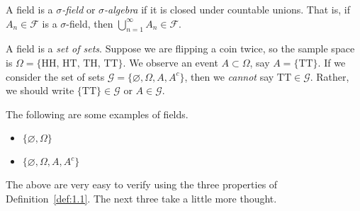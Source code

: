 \documentclass[11pt,fleqn]{book} %
\begin{document}
\begin{definition} \label{def:1.2}
	A field is a \emph{$\sigma$-field} or \emph{$\sigma$-algebra} if it is closed under countable unions. That is, if $A_n \in \mathcal{F}$ is a $\sigma$-field, then $\bigcup_{n=1}^\infty A_n \in \mathcal{F}$.
\end{definition}

\begin{remark} \label{rem:1.1}
	A field is a \emph{set of sets}. Suppose we are flipping a coin twice, so the sample space is $\Omega = \{\textrm{HH, HT, TH, TT}\}$. We observe an event $A \subset \Omega$, say $A = \{\textrm{TT}\}$. If we consider the set of sets $\mathcal{G} = \{\varnothing, \Omega, A, A^c\}$, then we \emph{cannot} say $\textrm{TT} \in \mathcal{G}$. Rather, we should write $\{\textrm{TT}\} \in \mathcal{G}$ or $A \in \mathcal{G}$. 
\end{remark}

The following are some examples of fields.

\begin{itemize}
	\item $\{\varnothing, \Omega\}$
	\item $\{\varnothing, \Omega, A, A^c\}$
\end{itemize}

The above are very easy to verify using the three properties of Definition~\ref{def:1.1}. The next three take a little more thought.
\end{document}

